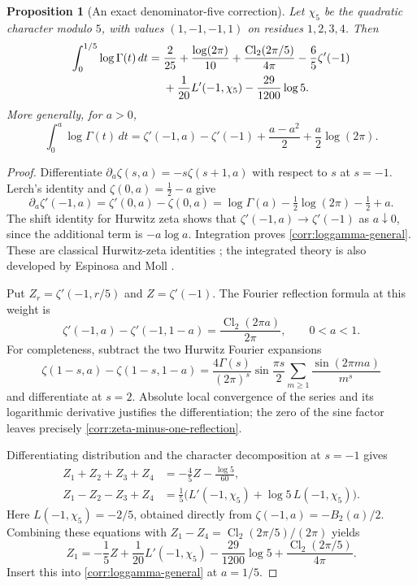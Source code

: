 \documentclass[11pt,a4paper]{article}
\newtheorem{proposition}[theorem]{Proposition}
\theoremstyle{definition}
\theoremstyle{remark}
\numberwithin{equation}{section}
\begin{document}
\begin{proposition}[An exact denominator-five correction]
\label{corr:loggamma-five}
Let $\chi_5$ be the quadratic character modulo $5$, with values
$(1,-1,-1,1)$ on residues $1,2,3,4$.  Then
\begin{align}
 \int_0^{1/5}\log\Gamma(t)\,dt
 ={}&\frac{2}{25}+\frac{\log(2\pi)}{10}
       +\frac{\operatorname{Cl}_2(2\pi/5)}{4\pi}
       -\frac65\zeta'(-1) \notag\\
    &+\frac1{20}L'(-1,\chi_5)-\frac{29}{1200}\log5.
 \label{corr:loggamma-five-formula}
\end{align}
More generally, for $a>0$,
\begin{equation}\label{corr:loggamma-general}
 \int_0^a\log\Gamma(t)\,dt
 =\zeta'(-1,a)-\zeta'(-1)
       +\frac{a-a^2}{2}+\frac a2\log(2\pi).
\end{equation}
\end{proposition}
\begin{proof}
Differentiate $\partial_a\zeta(s,a)=-s\zeta(s+1,a)$ with respect to
$s$ at $s=-1$.  Lerch's identity and $\zeta(0,a)=\tfrac12-a$ give
\[
 \partial_a\zeta'(-1,a)
 =\zeta'(0,a)-\zeta(0,a)
 =\log\Gamma(a)-\tfrac12\log(2\pi)-\tfrac12+a.
\]
The shift identity for Hurwitz zeta shows that
$\zeta'(-1,a)\to\zeta'(-1)$ as $a\downarrow0$, since the additional
term is $-a\log a$.  Integration proves
\eqref{corr:loggamma-general}.  These are classical Hurwitz-zeta
identities \cite{DLMF25}; the integrated theory is also developed by
Espinosa and Moll \cite{EspinosaMoll2002b}.

Put $Z_r=\zeta'(-1,r/5)$ and $Z=\zeta'(-1)$.  The Fourier reflection
formula at this weight is
\begin{equation}\label{corr:zeta-minus-one-reflection}
 \zeta'(-1,a)-\zeta'(-1,1-a)
       =\frac{\operatorname{Cl}_2(2\pi a)}{2\pi},
       \qquad 0<a<1.
\end{equation}
For completeness, subtract the two Hurwitz Fourier expansions
\[
 \zeta(1-s,a)-\zeta(1-s,1-a)
 =\frac{4\Gamma(s)}{(2\pi)^s}\sin\frac{\pi s}{2}
       \sum_{m\geq1}\frac{\sin(2\pi ma)}{m^s}
\]
and differentiate at $s=2$.  Absolute local convergence of the
series and its logarithmic derivative justifies the differentiation;
the zero of the sine factor leaves precisely
\eqref{corr:zeta-minus-one-reflection}.

Differentiating distribution and the character decomposition at $s=-1$
gives
\begin{align*}
 Z_1+Z_2+Z_3+Z_4&=-\frac45 Z-\frac{\log5}{60},\\
 Z_1-Z_2-Z_3+Z_4
   &=\frac15\bigl(L'(-1,\chi_5)+\log5\,L(-1,\chi_5)\bigr).
\end{align*}
Here $L(-1,\chi_5)=-2/5$, obtained directly from
$\zeta(-1,a)=-B_2(a)/2$.  Combining these equations with
$Z_1-Z_4=\operatorname{Cl}_2(2\pi/5)/(2\pi)$ yields
\[
 Z_1=-\frac15 Z+\frac1{20}L'(-1,\chi_5)
       -\frac{29}{1200}\log5
       +\frac{\operatorname{Cl}_2(2\pi/5)}{4\pi}.
\]
Insert this into \eqref{corr:loggamma-general} at $a=1/5$.
\end{proof}
\end{document}

